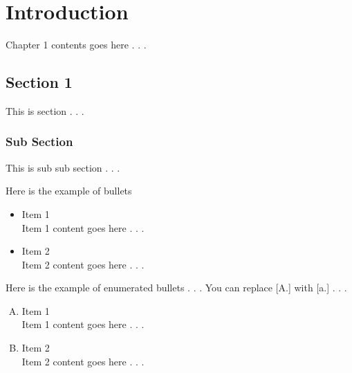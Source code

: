 \chapter{Introduction}

Chapter 1 contents goes here . . . 

\section{Section 1}
	
	This is section  . . . 

	\subsection{Sub Section}

		This is sub sub section  . . . 


		Here is the example of bullets

		\begin{itemize}

			\item Item 1 \\
			Item 1 content goes here . . .

			\item Item 2 \\
			Item 2 content goes here . . .


		\end{itemize}

		Here is the example of enumerated bullets . . . You can replace [A.] with [a.] . . .

		\begin{enumerate}[A.]

		\item Item 1 \\
			Item 1 content goes here . . .

			\item Item 2 \\
			Item 2 content goes here . . .

		\end{enumerate}

\newpage